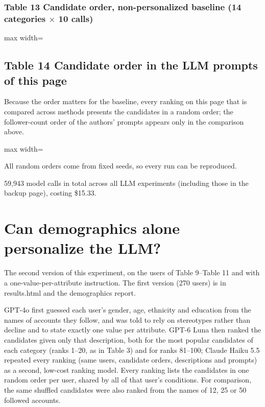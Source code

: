 \documentclass[10pt]{article}
\begin{document}
\subsubsection*{Table 13 \textperiodcentered{} Candidate order, non-personalized baseline (14 categories $\times$ 10 calls)}
\begin{center}\begin{adjustbox}{max width=\linewidth}

\end{adjustbox}\end{center}

\subsection*{Table 14 \textperiodcentered{} Candidate order in the LLM prompts of this page}
Because the order matters for the baseline, every ranking on this page that is compared across methods presents the candidates in a random order; the follower-count order of the authors' prompts appears only in the comparison above.

\begin{center}\begin{adjustbox}{max width=\linewidth}

\end{adjustbox}\end{center}

{\small All random orders come from fixed seeds, so every run can be reproduced.}

{\small 59,943 model calls in total across all LLM experiments (including those in the backup page), costing \$15.33.}

\section{Can demographics alone personalize the LLM?}
The second version of this experiment, on the users of Table 9--Table 11 and with a one-value-per-attribute instruction. The first version (270 users) is in results.html and the demographics report.

GPT-4o first guessed each user's gender, age, ethnicity and education from the names of accounts they follow, and was told to rely on stereotypes rather than decline and to state exactly one value per attribute. GPT-6 Luna then ranked the candidates given only that description, both for the most popular candidates of each category (ranks 1--20, as in Table 3) and for ranks 81--100; Claude Haiku 5.5 repeated every ranking (same users, candidate orders, descriptions and prompts) as a second, low-cost ranking model. Every ranking lists the candidates in one random order per user, shared by all of that user's conditions. For comparison, the same shuffled candidates were also ranked from the names of 12, 25 or 50 followed accounts.
\end{document}
